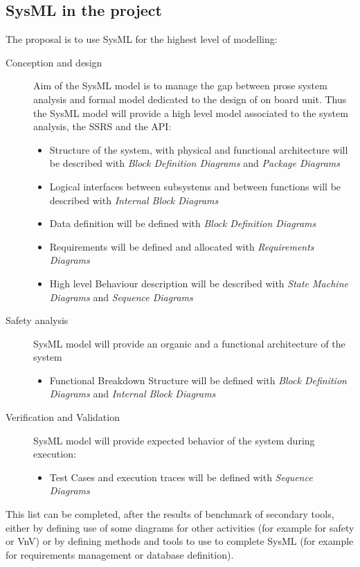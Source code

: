 \subsection{SysML in the project}

The proposal is to use SysML for the highest level of modelling:
\begin{description}
\item[Conception and design] Aim of the SysML model is to manage the gap  between prose system analysis and formal model dedicated to the design of on board unit. Thus the SysML model will provide a high level model associated to the system analysis, the SSRS and the API:
\begin{itemize}
\item Structure of the system, with physical and functional architecture will be described with \textit{Block Definition Diagrams} and \textit{Package Diagrams}
\item Logical interfaces between subsystems and between functions will be described with \textit{Internal Block Diagrams}
\item Data definition will be defined with \textit{Block Definition Diagrams}
\item Requirements will be defined and allocated with \textit{Requirements Diagrams}
\item High level Behaviour description will be described with \textit{State Machine Diagrams} and \textit{Sequence Diagrams}
\end{itemize}
\item[Safety analysis] SysML model will provide an organic and a functional architecture of the system
\begin{itemize}
\item Functional Breakdown Structure will be defined with \textit{Block Definition Diagrams} and \textit{Internal Block Diagrams}
\end{itemize}
\item[Verification and Validation] SysML model will provide expected behavior of the system during execution: 
\begin{itemize}
\item Test Cases and execution traces will be defined with \textit{Sequence Diagrams}
\end{itemize}
\end{description}

This list can be completed, after the results of benchmark  of secondary tools, either by defining use of some diagrams for other activities (for example for safety or VnV) or by defining methods and tools to use to complete SysML (for example for requirements management or database definition).

